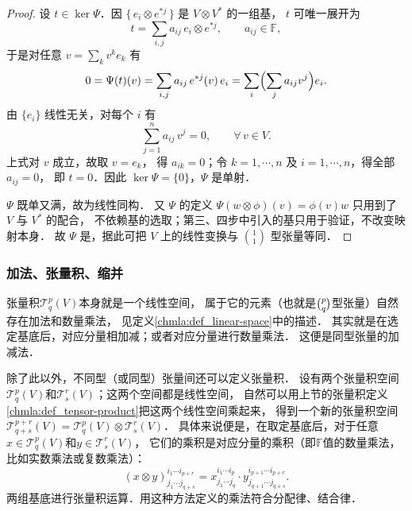 \begin{proof}
	
	设 $t\in\ker\Psi$．因 $\{\,e_i\otimes e^{*j}\,\}$ 是 $V\otimes V^*$ 的一组基，
	$t$ 可唯一展开为
	\begin{equation*}
		t=\sum_{i,j}a_{ij}\,e_i\otimes e^{*j},
		\qquad a_{ij}\in\mathbb{F},
	\end{equation*}
	于是对任意 $v=\sum_{k}v^k e_k$ 有
	\begin{equation*}
		0=\Psi(t)(v)
		=\sum_{i,j}a_{ij}\,e^{*j}(v)\,e_i
		=\sum_{i}\Bigl(\sum_{j}a_{ij}v^j\Bigr)e_i .
	\end{equation*}
	由 $\{e_i\}$ 线性无关，对每个 $i$ 有
	\begin{equation*}
		\sum_{j=1}^{n}a_{ij}\,v^j=0,
		\qquad \forall\, v\in V .
	\end{equation*}
	上式对 $v$ 成立，故取 $v=e_k$，
	得 $a_{ik}=0$；令 $k=1,\cdots,n$ 及 $i=1,\cdots,n$，得全部 $a_{ij}=0$，
	即 $t=0$．因此 $\ker\Psi=\{0\}$，$\Psi$ 是单射．
	
	
	$\Psi$ 既单又满，故为线性同构．
	又 $\Psi$ 的定义 $\Psi(w\otimes\phi)(v)=\phi(v)w$ 只用到了 $V$ 与 $V^*$ 的配合，
	不依赖基的选取；第三、四步中引入的基只用于验证，不改变映射本身．
	故 $\Psi$ 是，据此可把 $V$ 上的线性变换与
	$\binom{1}{1}$ 型张量等同．
\end{proof}


\subsubsection*{加法、张量积、缩并}
张量积$\mathcal{T}^p_q(V)$本身就是一个线性空间，
属于它的元素（也就是$\binom{p}{q}$型张量）自然存在加法和数量乘法，
见定义\ref{chmla:def_linear-space}中的描述．
其实就是在选定基底后，对应分量相加减；或者对应分量进行数量乘法．
这便是同型张量的{\heiti 加减法}．


除了此以外，不同型（或同型）张量间还可以定义{\heiti 张量积}．
设有两个张量积空间$\mathcal{T}^p_q(V)$和$\mathcal{T}^r_s(V)$；这两个空间都是线性空间，
自然可以用上节的张量积定义\ref{chmla:def_tensor-product}把这两个线性空间{\kaishu 乘}起来，
得到一个新的张量积空间$\mathcal{T}^{p+r}_{q+s}(V)=\mathcal{T}^p_q(V)\otimes \mathcal{T}^r_s(V)$．
具体来说便是，在取定基底后，对于任意$x\in \mathcal{T}^p_q(V)$和$y\in \mathcal{T}^r_s(V)$，
它们的乘积是对应分量的乘积（即$\mathbb{F}$值的数量乘法，比如实数乘法或复数乘法）：
\begin{equation}
    (x\otimes y)^{i_1\cdots i_{p+r}}_{j_1\cdots j_{q+s}}=
    x^{i_1\cdots i_{p}}_{j_1\cdots j_{q}} \cdot
    y^{i_{p +1}\cdots i_{p+r}}_{j_{q+1}\cdots j_{q+s}} .
\end{equation}
两组基底进行张量积运算．用这种方法定义的乘法符合分配律、结合律．

